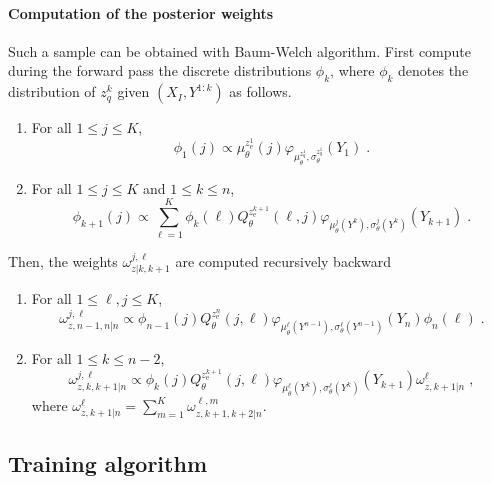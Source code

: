 \documentclass{article}
\newcommand{\eqsp}{\;}
\newcommand{\rme}{\mathrm{e}}
\begin{document}
%

\paragraph{Computation of the posterior weights}
Such a sample can be obtained with Baum-Welch algorithm.
First compute during the forward pass the discrete distributions $\phi_k$, where $\phi_k$ denotes the distribution of $z_q^k$ given $(X_I,Y^{1:k})$ as follows.
\begin{enumerate}
\item For all $1\leqslant j \leqslant K$,
$$
\phi_1(j) \propto \mu^{z_\rme^1}_{\theta}(j) \varphi_{\mu^{z_q^{1}}_\theta,\sigma^{z_q^{1}}_\theta}(Y_1)\eqsp.
$$
\item For all $1\leqslant j \leqslant K$ and  $1\leqslant k \leqslant n$,
$$
\phi_{k+1}(j) \propto \sum_{\ell=1}^K \phi_{k}(\ell)  Q^{z_\rme^{k+1}}_{\theta}(\ell,j) \varphi_{\mu^{j}_\theta (Y^{k}),\sigma^{j}_\theta(Y^{k})}(Y_{k+1})\eqsp.
$$
\end{enumerate}
Then, the weights $ \omega^{j,\ell}_{z|k,k+1}$ are computed recursively backward
\begin{enumerate}
\item For all $1\leqslant \ell,j \leqslant K$,
$$
\omega^{j,\ell}_{z,n-1,n|n} \propto \phi_{n-1}(j)Q^{z_\rme^{n}}_{\theta}(j,\ell) \varphi_{\mu^{\ell}_\theta(Y^{n-1}),\sigma^{\ell}_\theta(Y^{n-1})}(Y_{n})\phi_{n}(\ell)   \eqsp.
$$
\item For all  $1\leqslant k \leqslant n-2$,
$$
\omega^{j,\ell}_{z,k,k+1|n} \propto \phi_{k}(j)Q^{z_\rme^{k+1}}_{\theta}(j,\ell) \varphi_{\mu^{\ell}_\theta(Y^{k}),\sigma^{\ell}_\theta(Y^{k})}(Y_{k+1})\omega^{\ell}_{z,k+1|n}  \eqsp,
$$
where $\omega^{\ell}_{z,k+1|n} = \sum_{m=1}^K\omega^{\ell,m}_{z,k+1,k+2|n}$.
\end{enumerate}

\subsection{Training algorithm}
%
%
\end{document}

